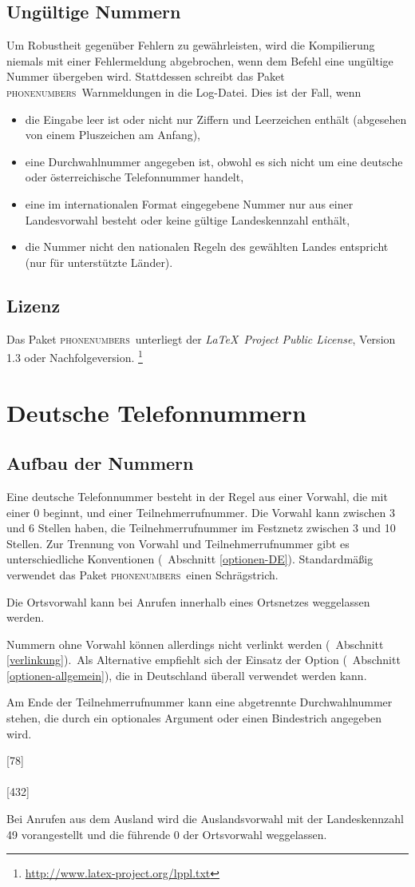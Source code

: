\documentclass[numbers=noenddot]{scrreprt}
\newcommand*{\Paket}[1]{\textsc{#1}}
\newcommand{\phone}{\textcolor{cnltx}{\Paket{phone\-numbers}}}
\newcommand{\UeberschriftAufbau}{\section{Aufbau der Nummern}}
\newcommand{\UeberschriftUngueltig}{\section{Ungültige Nummern}}
\newcommand{\KeineVerlinkung}{Nummern ohne Vorwahl können allerdings nicht verlinkt werden
\vglAbschnitt{verlinkung}.}
\newcommand*{\vglAbschnitt}[1]{(\cf\ Abschnitt \ref{#1})}
\newcommand*{\AufbauDEATA}[6]{Eine #1 Telefonnummer besteht in der Regel aus einer Vorwahl, die mit einer 0 beginnt, und einer Teilnehmerrufnummer. Die Vorwahl kann zwischen #2 und #3 Stellen haben, die Teilnehmerrufnummer im Festznetz zwischen #4 und #5 Stellen. Zur Trennung von Vorwahl und Teilnehmerrufnummer gibt es unterschiedliche Konventionen
\vglAbschnitt{#6}.
Standardmäßig verwendet das Paket \phone\ einen Schrägstrich.}
\newcommand{\AufbauDEATB}{Die Ortsvorwahl kann bei Anrufen innerhalb eines Ortsnetzes weggelassen werden.}
\newcommand{\AufbauDEATC}[1]{\KeineVerlinkung\ Als Alternative empfiehlt sich der Einsatz der Option \option{home-area-code}
\vglAbschnitt{optionen-allgemein},
die in #1 überall verwendet werden kann.\par
Am Ende der Teilnehmerrufnummer kann eine abgetrennte Durchwahlnummer stehen, die durch ein optionales Argument oder einen Bindestrich angegeben wird.}
\newcommand*{\AufbauDEATD}[1]{Bei Anrufen aus dem Ausland wird die Auslandsvorwahl mit der Landeskennzahl #1 vorangestellt und die führende 0 der Ortsvorwahl weggelassen.}
\begin{document}
\UeberschriftUngueltig
Um Robustheit gegenüber Fehlern zu gewährleisten, wird die Kompilierung niemals mit einer Fehlermeldung abgebrochen, wenn dem Befehl  eine ungültige Nummer übergeben wird. Stattdessen schreibt das Paket \phone\ Warnmeldungen in die Log-Datei.
Dies ist der Fall, wenn
\begin{itemize}
\item die Eingabe leer ist oder nicht nur Ziffern und Leerzeichen enthält (abgesehen von einem Pluszeichen am Anfang),
\item eine Durchwahlnummer angegeben ist, obwohl es sich nicht um eine deutsche oder österreichische Telefonnummer handelt,
\item eine im internationalen Format eingegebene Nummer nur aus einer Landesvorwahl besteht oder keine gültige Landeskennzahl enthält,
\item die Nummer nicht den nationalen Regeln des gewählten Landes entspricht (nur für unterstützte Länder).
\end{itemize}

\section{Lizenz}
Das Paket \phone\ unterliegt der
\emph{\LaTeX\ Project Public License},
Version 1.3 oder Nachfolgeversion.%
\footnote{\url{http://www.latex-project.org/lppl.txt}}

\chapter{Deutsche Telefonnummern}
\UeberschriftAufbau
\AufbauDEATA{deutsche}{3}{6}{3}{10}{optionen-DE}
\begin{sidebyside}
\end{sidebyside}

\AufbauDEATB
\begin{sidebyside}
\end{sidebyside}
\AufbauDEATC{Deutschland}
\begin{sidebyside}
  [78] \\
   \\
  [432] \\
\end{sidebyside}

\AufbauDEATD{49}
\begin{sidebyside}
\end{sidebyside}
\end{document}

